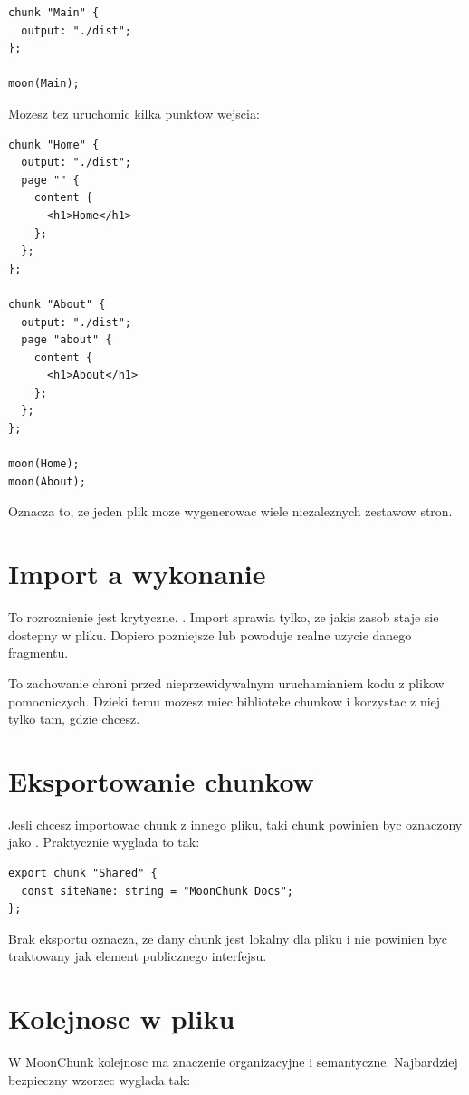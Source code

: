 \begin{lstlisting}[style=moonchunk,caption={Jawny punkt wejscia}]
chunk "Main" {
  output: "./dist";
};

moon(Main);
\end{lstlisting}

Mozesz tez uruchomic kilka punktow wejscia:

\begin{lstlisting}[style=moonchunk,caption={Wiele wywolan moon(...)}]
chunk "Home" {
  output: "./dist";
  page "" {
    content {
      <h1>Home</h1>
    };
  };
};

chunk "About" {
  output: "./dist";
  page "about" {
    content {
      <h1>About</h1>
    };
  };
};

moon(Home);
moon(About);
\end{lstlisting}

Oznacza to, ze jeden plik moze wygenerowac wiele niezaleznych zestawow stron.

\section{Import a wykonanie}
To rozroznienie jest krytyczne. . Import
sprawia tylko, ze jakis zasob staje sie dostepny w pliku. Dopiero pozniejsze
 lub  powoduje realne uzycie danego fragmentu.

To zachowanie chroni przed nieprzewidywalnym uruchamianiem kodu z plikow pomocniczych.
Dzieki temu mozesz miec biblioteke chunkow i korzystac z niej tylko tam, gdzie chcesz.

\section{Eksportowanie chunkow}
Jesli chcesz importowac chunk z innego pliku, taki chunk powinien byc oznaczony jako
. Praktycznie wyglada to tak:

\begin{lstlisting}[style=moonchunk,caption={Chunk eksportowany do innych plikow}]
export chunk "Shared" {
  const siteName: string = "MoonChunk Docs";
};
\end{lstlisting}

Brak eksportu oznacza, ze dany chunk jest lokalny dla pliku i nie powinien byc
traktowany jak element publicznego interfejsu.

\section{Kolejnosc w pliku}
W MoonChunk kolejnosc ma znaczenie organizacyjne i semantyczne. Najbardziej bezpieczny
wzorzec wyglada tak:

